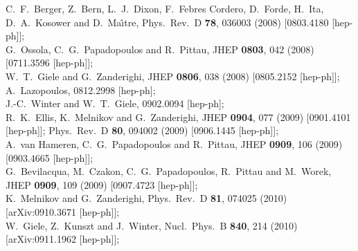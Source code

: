 \documentclass[aps,prd,preprint,groupedaddress,nofootinbib,showpacs,eqsecnum]{revtex4}
\begin{document}
\begin{thebibliography}{99}
C.~F.~Berger,
Z.~Bern, L.~J.~Dixon, F.~Febres Cordero, D.~Forde, H.~Ita,
D.~A.~Kosower and D.~Ma\^{\i}tre,
Phys.\ Rev.\ D {\bf 78}, 036003 (2008)
[0803.4180 [hep-ph]];\\
G.~Ossola, C.~G.~Papadopoulos and R.~Pittau,
JHEP {\bf 0803}, 042 (2008)
[0711.3596 [hep-ph]];\\
%
W.~T.~Giele and G.~Zanderighi,
JHEP {\bf 0806}, 038 (2008)
[0805.2152 [hep-ph]];\\
%
A.~Lazopoulos,
0812.2998 [hep-ph];\\
%
J.-C.~Winter and W.~T.~Giele,
0902.0094 [hep-ph];\\
R.~K.~Ellis, K.~Melnikov and G.~Zanderighi,
JHEP {\bf 0904}, 077 (2009)
[0901.4101 [hep-ph]];
Phys.\ Rev.\  D {\bf 80}, 094002 (2009)
[0906.1445 [hep-ph]];\\
A.~van Hameren, C.~G.~Papadopoulos and R.~Pittau,
JHEP {\bf 0909}, 106 (2009)
[0903.4665 [hep-ph]];\\
G.~Bevilacqua, M.~Czakon, C.~G.~Papadopoulos, R.~Pittau and M.~Worek,
JHEP {\bf 0909}, 109 (2009)
[0907.4723 [hep-ph]];\\
K.~Melnikov and G.~Zanderighi,
Phys.\ Rev.\  D {\bf 81}, 074025 (2010)
[arXiv:0910.3671 [hep-ph]];\\
W.~Giele, Z.~Kunszt and J.~Winter,
Nucl.\ Phys.\  B {\bf 840}, 214 (2010)
[arXiv:0911.1962 [hep-ph]];\\

\end{thebibliography}
\end{document}
